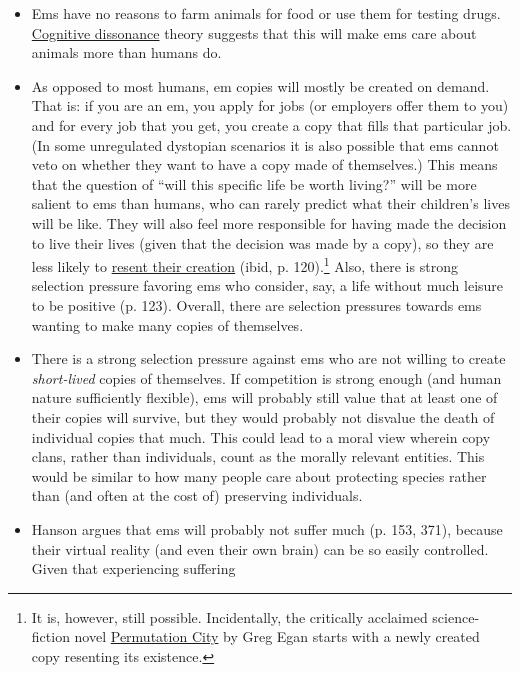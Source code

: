 \documentclass[]{article}
\begin{document}
\begin{itemize}
\item
  Ems have no reasons to farm animals for food or use them for testing
  drugs.
  \href{https://en.wikipedia.org/wiki/Cognitive_dissonance}{Cognitive
  dissonance} theory suggests that this will make ems care about
  animals more than humans do.
\item
  As opposed to most humans, em copies will mostly be created on demand.
  That is: if you are an em, you apply for jobs (or employers offer them
  to you) and for every job that you get, you create a copy that fills
  that particular job. (In some unregulated dystopian scenarios it is
  also possible that ems cannot veto on whether they want to have a copy
  made of themselves.) This means that the question of ``will this
  specific life be worth living?'' will be more salient to ems than
  humans, who can rarely predict what their children's lives will be
  like. They will also feel more responsible for having made the
  decision to live their lives (given that the decision was made by a
  copy), so they are less likely to
  \href{https://en.wikipedia.org/wiki/Antinatalism}{resent their
  creation} (ibid, p. 120).\footnote{It is, however, still possible.
    Incidentally, the critically acclaimed science-fiction novel
    \href{https://en.wikipedia.org/wiki/Permutation_City}{Permutation
    City} by Greg Egan starts with a newly created copy resenting its
    existence.} Also, there is strong selection pressure favoring ems
  who consider, say, a life without much leisure to be positive (p.
  123). Overall, there are selection pressures towards ems wanting to
  make many copies of themselves.
\item
  There is a strong selection pressure against ems who are not willing
  to create \emph{short-lived} copies of themselves. If competition is
  strong enough (and human nature sufficiently flexible), ems will
  probably still value that at least one of their copies will survive,
  but they would probably not disvalue the death of individual copies
  that much. This could lead to a moral view wherein copy clans, rather
  than individuals, count as the morally relevant entities. This would
  be similar to how many people care about protecting species rather
  than (and often at the cost of) preserving individuals.
\item
  Hanson argues that ems will probably not suffer much (p. 153, 371),
  because their virtual reality (and even their own brain) can be so
  easily controlled. Given that experiencing suffering

\end{itemize}
\end{document}
